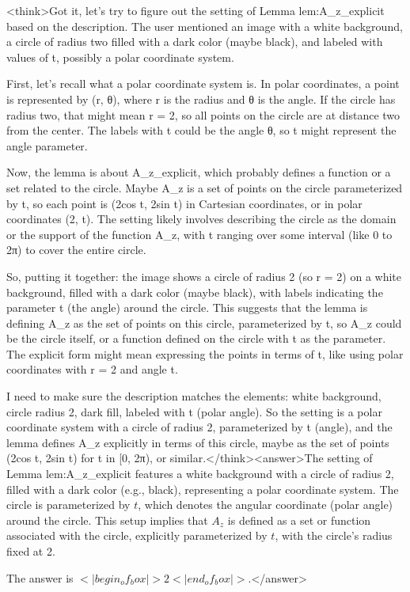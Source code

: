 <think>Got it, let's try to figure out the setting of Lemma lem:A_z_explicit based on the description. The user mentioned an image with a white background, a circle of radius two filled with a dark color (maybe black), and labeled with values of t, possibly a polar coordinate system. 

First, let's recall what a polar coordinate system is. In polar coordinates, a point is represented by (r, θ), where r is the radius and θ is the angle. If the circle has radius two, that might mean r = 2, so all points on the circle are at distance two from the center. The labels with t could be the angle θ, so t might represent the angle parameter. 

Now, the lemma is about A_z_explicit, which probably defines a function or a set related to the circle. Maybe A_z is a set of points on the circle parameterized by t, so each point is (2cos t, 2sin t) in Cartesian coordinates, or in polar coordinates (2, t). The setting likely involves describing the circle as the domain or the support of the function A_z, with t ranging over some interval (like 0 to 2π) to cover the entire circle. 

So, putting it together: the image shows a circle of radius 2 (so r = 2) on a white background, filled with a dark color (maybe black), with labels indicating the parameter t (the angle) around the circle. This suggests that the lemma is defining A_z as the set of points on this circle, parameterized by t, so A_z could be the circle itself, or a function defined on the circle with t as the parameter. The explicit form might mean expressing the points in terms of t, like using polar coordinates with r = 2 and angle t. 

I need to make sure the description matches the elements: white background, circle radius 2, dark fill, labeled with t (polar angle). So the setting is a polar coordinate system with a circle of radius 2, parameterized by t (angle), and the lemma defines A_z explicitly in terms of this circle, maybe as the set of points (2cos t, 2sin t) for t in [0, 2π), or similar.</think><answer>The setting of Lemma lem:A_z_explicit features a white background with a circle of radius 2, filled with a dark color (e.g., black), representing a polar coordinate system. The circle is parameterized by \( t \), which denotes the angular coordinate (polar angle) around the circle. This setup implies that \( A_z \) is defined as a set or function associated with the circle, explicitly parameterized by \( t \), with the circle’s radius fixed at 2.  

The answer is \(<|begin_of_box|>2<|end_of_box|>\).</answer>